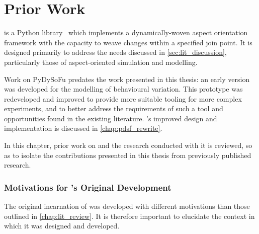 \chapter{Prior Work}\label{chap:prior_work}




\pdsf is a Python library~\cite{pdsf_repo} which implements a dynamically-woven
aspect orientation framework with the capacity to weave changes within a
specified join point. It is designed primarily to address the needs discussed in
\cref{sec:lit_discussion}, particularly those of aspect-oriented simulation and
modelling.

Work on PyDySoFu predates the work presented in this thesis: an early version
was developed for the modelling of behavioural variation. This prototype was
redeveloped and improved to provide more suitable tooling for more complex
experiments, and to better address the requirements of such a tool and
opportunities found in the existing literature. \pdsf{}'s improved design and
implementation is discussed in \cref{chap:pdsf_rewrite}. 

In this chapter, prior work on \pdsf{} and the research conducted with it is
reviewed, so as to isolate the contributions presented in this thesis from
previously published research.

\subsection{Motivations for \pdsf{}'s Original Development}

The original incarnation of \pdsf{} was developed with different motivations
than those outlined in \cref{chap:lit_review}. It is therefore important to
elucidate the context in which it was designed and developed.

